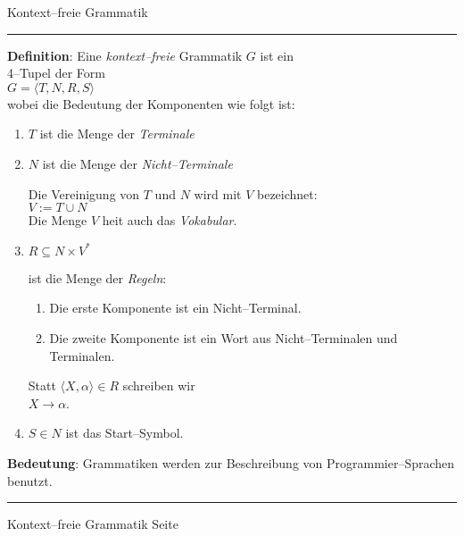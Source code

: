 \documentclass{slides}
\newcounter{mypage}
\begin{document}
\begin{center}
Kontext--freie Grammatik
\end{center}


\rule{17cm}{1mm}

\footnotesize
\vspace*{0.2cm}
\textbf{Definition}: Eine \emph{kontext--freie} Grammatik $G$ ist ein \\
\hspace*{3.5cm} 4--Tupel der Form \\[0.3cm]
\hspace*{4.3cm} $G = \langle T, N, R, S \rangle$ \\[0.3cm]
wobei die Bedeutung der Komponenten wie folgt ist:
\begin{enumerate}
\item $T$ ist die Menge der \emph{Terminale}
\item $N$ ist die Menge der \emph{Nicht--Terminale}

      Die Vereinigung von $T$ und $N$ wird mit $V$ bezeichnet: \\[0.3cm]
      \hspace*{1.3cm} $V := T \cup N$ \\[0.3cm]
      Die Menge $V$ hei\3t auch das \emph{Vokabular}.
\item $R \subseteq N \times V^*$ 

      ist die Menge der \emph{Regeln}:
      \begin{enumerate}
      \item Die erste Komponente ist ein Nicht--Terminal.
      \item Die zweite Komponente ist ein Wort aus  Nicht--Terminalen und Terminalen.
      \end{enumerate}
      Statt $\langle X, \alpha \rangle \in R$ schreiben wir \\[0.3cm]
      \hspace*{1.3cm} $X \rightarrow \alpha$.
\item $S \in N$ ist das Start--Symbol.
\end{enumerate}
\textbf{Bedeutung}: Grammatiken werden zur Beschreibung von Programmier--Sprachen benutzt.

\scriptsize

\vspace*{\fill}
\tiny \addtocounter{mypage}{1}
\rule{17cm}{1mm}
Kontext--freie Grammatik  \hspace*{\fill} Seite 



\end{document}
